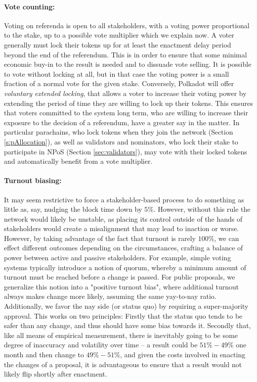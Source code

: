 \paragraph{Vote counting:} Voting on referenda is open to all stakeholders, with a voting power proportional to the stake, up to a possible vote multiplier which we explain now. A voter generally must lock their tokens up for at least the enactment delay period beyond the end of the referendum. This is in order to ensure that some minimal economic buy-in to the result is needed and to dissuade vote selling. It is possible to vote without locking at all, but in that case the voting power is a small fraction of a normal vote for the given stake. Conversely, Polkadot will offer \emph{voluntary extended locking}, that allows a voter to increase their voting power by extending the period of time they are willing to lock up their tokens. This ensures that voters committed to the system long term, who are willing to increase their exposure to the decision of a referendum, have a greater say in the matter. In particular parachains, who lock tokens when they join the network (Section \ref{s:pAllocation}), as well as validators and nominators, who lock their stake to participate in NPoS (Section \ref{sec:validators}), may vote with their locked tokens and automatically benefit from a vote multiplier.

\paragraph{Turnout biasing:} It may seem restrictive to force a stakeholder-based process to do something as little as, say, nudging the block time down by $5\%$. However, without this rule the network would likely be unstable, as placing its control outside of the hands of stakeholders would create a misalignment that may lead to inaction or worse. However, by taking advantage of the fact that turnout is rarely $100\%$, we can effect different outcomes depending on the circumstances, crafting a balance of power between active and passive stakeholders. For example, simple voting systems typically introduce a notion of quorum, whereby a minimum amount of turnout must be reached before a change is passed. For public proposals, we generalize this notion into a "positive turnout bias", where additional turnout always makes change more likely, assuming the same yay-to-nay ratio. Additionally, we favor the nay side (or status quo) by requiring a super-majority approval. This works on two principles: Firstly that the status quo tends to be safer than any change, and thus should have some bias towards it. Secondly that, like all means of empirical measurement, there is inevitably going to be some degree of inaccuracy and volatility over time -- a result could be $51\%-49\%$ one month and then change to $49\%-51\%$, and given the costs involved in enacting the changes of a proposal, it is advantageous to ensure that a result would not likely flip shortly after enactment. 

